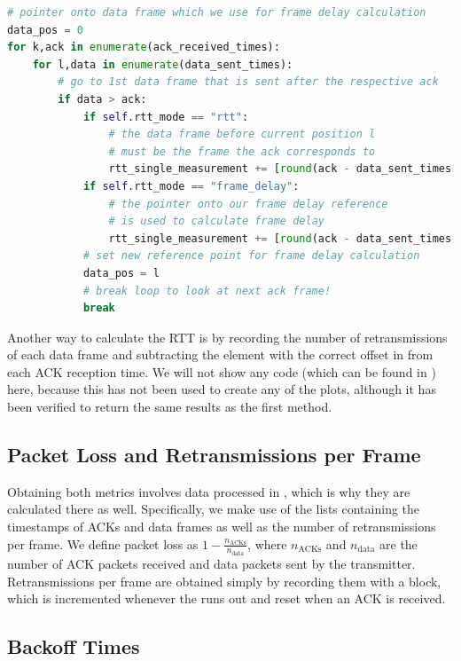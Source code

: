 \begin{lstlisting}[language=Python, caption=The method used in \code{rtt\_alternative.py} to calculate rtt and frame\_delay,label=lst:rtt]
# pointer onto data frame which we use for frame delay calculation
data_pos = 0
for k,ack in enumerate(ack_received_times):
    for l,data in enumerate(data_sent_times):
		# go to 1st data frame that is sent after the respective ack 
        if data > ack:
            if self.rtt_mode == "rtt":
				# the data frame before current position l 
				# must be the frame the ack corresponds to
                rtt_single_measurement += [round(ack - data_sent_times[l-1],5)]
            if self.rtt_mode == "frame_delay":
				# the pointer onto our frame delay reference
				# is used to calculate frame delay
                rtt_single_measurement += [round(ack - data_sent_times[data_pos], 5)]
			# set new reference point for frame delay calculation
            data_pos = l
			# break loop to look at next ack frame!
            break
\end{lstlisting} 

Another way to calculate the RTT is by recording the number of retransmissions of each data frame and subtracting the element with the correct offset in  from each ACK reception time. We will not show any code (which can be found in ) here, because this has not been used to create any of the plots, although it has been verified to return the same results as the first method. 

\subsection{Packet Loss and Retransmissions per Frame}

Obtaining both metrics involves data processed in , which is why they are calculated there as well. Specifically, we make use of the lists containing the timestamps of ACKs and data frames as well as the number of retransmissions per frame. 
We define packet loss as $ 1 - \frac{n_\text{ACKs}}{n_\text{data}} $, where $ n_\text{ACKs} $ and $ n_\text{data} $ are the number of ACK packets received and data packets sent by the transmitter.
Retransmissions per frame are obtained simply by recording them with a  block, which is incremented whenever the  runs out and reset when an ACK is received.

\subsection{Backoff Times}

